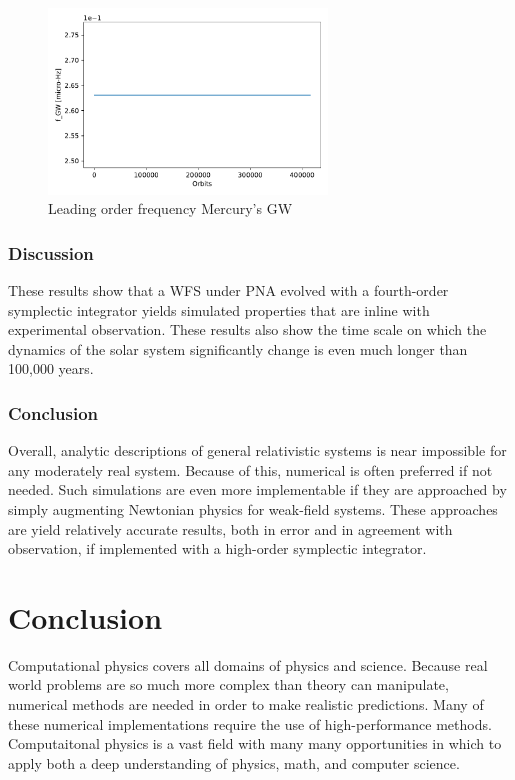 \documentclass{report}
\begin{document}
            \begin{figure}
                \centering
                \includegraphics[width=0.66\textwidth]{images/GW_freq_100000.pdf}
                \caption{Leading order frequency Mercury's GW}
                \label{fig:GWFreq}
            \end{figure}

        \subsection{Discussion}

            These results show that a WFS under PNA evolved with a fourth-order symplectic integrator yields simulated properties that are inline with experimental observation.  These results also show the time scale on which the dynamics of the solar system significantly change is even much longer than 100,000 years.

        \subsection{Conclusion}

            Overall, analytic descriptions of general relativistic systems is near impossible for any moderately real system.  Because of this, numerical is often preferred if not needed.  Such simulations are even more implementable if they are approached by simply augmenting Newtonian physics for weak-field systems.  These approaches are yield relatively accurate results, both in error and in agreement with observation, if implemented with a high-order symplectic integrator.

\chapter{Conclusion}

    Computational physics covers all domains of physics and science.  Because real world problems are so much more complex than theory can manipulate, numerical methods are needed in order to make realistic predictions.  Many of these numerical implementations require the use of high-performance methods.  Computaitonal physics is a vast field with many many opportunities in which to apply both a deep understanding of physics, math, and computer science.

\pagebreak
\printbibliography

\printindex
\end{document}
